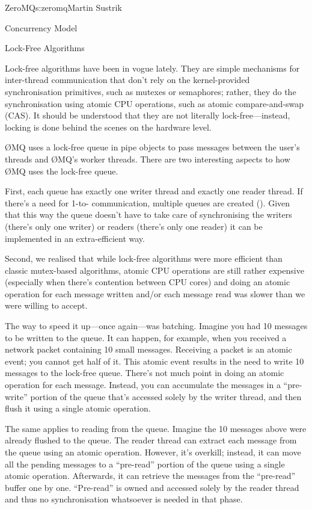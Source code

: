 \begin{aosachapter}{ZeroMQ}{s:zeromq}{Martin Sustrik}
\begin{aosasect1}{Concurrency Model}
\end{aosasect1}

\begin{aosasect1}{Lock-Free Algorithms}

Lock-free algorithms have been in vogue lately. They are simple
mechanisms for inter-thread communication that don't rely on the
kernel-provided synchronisation primitives, such as mutexes or
semaphores; rather, they do the synchronisation using atomic CPU
operations, such as atomic compare-and-swap (CAS). It should be
understood that they are not literally lock-free---instead, locking is
done behind the scenes on the hardware level.

{\O}MQ uses a lock-free queue in pipe objects to pass messages between the
user's threads and {\O}MQ's worker threads. There are two interesting
aspects to how {\O}MQ uses the lock-free queue.

First, each queue has exactly one writer thread and exactly one reader
thread. If there's a need for 1-to- communication, multiple queues
are created ().  Given that this way
the queue doesn't have to take care of synchronising the writers
(there's only one writer) or readers (there's only one reader) it can
be implemented in an extra-efficient way.


Second, we realised that while lock-free algorithms were more
efficient than classic mutex-based algorithms, atomic CPU operations
are still rather expensive (especially when there's contention between
CPU cores) and doing an atomic operation for each message written
and/or each message read was slower than we were willing to accept.

The way to speed it up---once again---was batching.  Imagine you had
10 messages to be written to the queue. It can happen, for example,
when you received a network packet containing 10 small
messages. Receiving a packet is an atomic event; you cannot get 
half of it. This atomic event results in the need to write 10 messages to
the lock-free queue. There's not much point in doing an atomic
operation for each message. Instead, you can accumulate the messages
in a ``pre-write'' portion of the queue that's accessed solely by the
writer thread, and then flush it using a single atomic operation.

The same applies to reading from the queue. Imagine the 10 messages above
were already flushed to the queue. The reader thread can extract each
message from the queue using an atomic operation. However, it's 
overkill; instead, it can move all the pending messages to a
``pre-read'' portion of the queue using a single atomic
operation. Afterwards, it can retrieve the messages from the ``pre-read''
buffer one by one. ``Pre-read'' is owned and accessed solely by the
reader thread and thus no synchronisation whatsoever is needed in that
phase.


\end{aosasect1}
\end{aosachapter}
